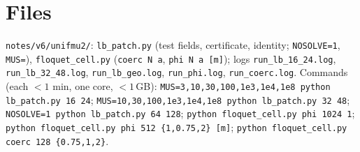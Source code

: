 \documentclass[11pt]{article}
\theoremstyle{remark}
\begin{document}
\section{Files}
\texttt{notes/v6/unifmu2/}: \texttt{lb\_patch.py} (test fields, certificate, identity; \texttt{NOSOLVE=1}, \texttt{MUS=}), \texttt{floquet\_cell.py} (\texttt{coerc N a}, \texttt{phi N a [m]}); logs \texttt{run\_lb\_16\_24.log}, \texttt{run\_lb\_32\_48.log}, \texttt{run\_lb\_geo.log}, \texttt{run\_phi.log}, \texttt{run\_coerc.log}. Commands (each $<1$ min, one core, $<1$\,GB): \texttt{MUS=3,10,30,100,1e3,1e4,1e8 python lb\_patch.py 16 24}; \texttt{MUS=10,30,100,1e3,1e4,1e8 python lb\_patch.py 32 48}; \texttt{NOSOLVE=1 python lb\_patch.py 64 128}; \texttt{python floquet\_cell.py phi 1024 1}; \texttt{python floquet\_cell.py phi 512 \{1,0.75,2\} [m]}; \texttt{python floquet\_cell.py coerc 128 \{0.75,1,2\}}.
\end{document}
